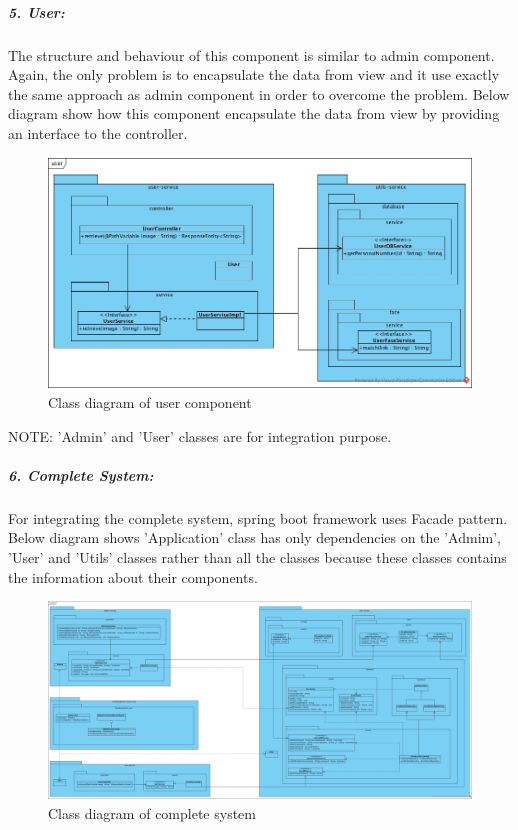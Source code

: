 \documentclass[a4paper,11pt]{article}
\begin{document}
\subparagraph{5. User: }The structure and behaviour of this component is similar to admin component. Again, the only problem is to encapsulate the data from view and it use exactly the same approach as admin component in order to overcome the problem. Below diagram show how this component encapsulate the data from view by providing an interface to the controller.

\begin{figure}[ht!]
    \centering
	\includegraphics[width=130mm]{ClassDiagrams/new/user.jpg}
	\caption{Class diagram of user component}
\end{figure}

NOTE: 'Admin' and 'User' classes are  for integration purpose.


\newpage


\subparagraph{6. Complete System: }
For integrating the complete system, spring boot framework uses Facade pattern. Below diagram shows 'Application' class has only dependencies on the 'Admim', 'User' and 'Utils' classes rather than all the classes because these classes contains the information about their components.
\begin{figure}[ht!]
    \centering
	\includegraphics[width=170mm]{ClassDiagrams/new/system.jpg}
	\caption{Class diagram of complete system}
\end{figure}
\end{document}
